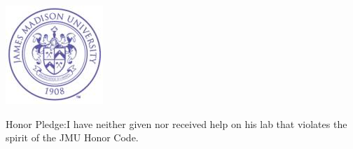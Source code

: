 \documentclass[main.tex]{subfiles}
\begin{document}
\begin{titlepage}
\includegraphics{img/00_seal.jpg}\\[1cm] %
\begin{flushleft} Honor Pledge:I have neither given nor received help on his lab that violates the spirit of the JMU Honor Code.\\[0.5cm]
\end{flushleft}
\begin{adjustbox}{width=1.2\textwidth,center=\textwidth}
\end{adjustbox}
\vfill %
\end{titlepage}
\end{document}
